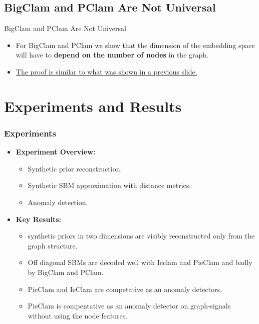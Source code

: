 \documentclass{beamer}
\begin{document}
\subsection{BigClam and PClam Are Not Universal}
\begin{frame}{BigClam and PClam Are Not Universal}

    \begin{itemize}[itemsep=1em, label=\textbullet]
        \item For BigClam and PClam we show that the dimension of the embedding space will have to \textbf{depend on the number of nodes} in the graph.
        \item \hyperlink{bipartite_blindspot}{The proof is similar to what was shown in a previous slide.}
    \end{itemize}
\end{frame}





\section{Experiments and Results}

\begin{frame}
\frametitle{Experiments}
\begin{itemize}[itemsep=1em, label=\textbullet]
    \item \textbf{Experiment Overview:}
    \begin{itemize}[itemsep=1em, label=\textbullet]
        \item Synthetic prior reconstruction.%
        \item Synthetic SBM approximation with distance metrics.%
        \item Anomaly detection.%
    \end{itemize}
    \item \textbf{Key Results:}%
    \begin{itemize}[itemsep=1em, label=\textbullet]
    \item synthetic priors in two dimensions are visibly reconstructed only from the graph structure.%
    \item Off diagonal SBMs are decoded well with Ieclam and PieClam and badly by BigClam and PClam.%
    \item PieClam and IeClam are competative as an anomaly detectors.%
    \item PieClam is compentative as an anomaly detector on graph-signals without using the node features.%
    \end{itemize}
\end{itemize}
\end{frame}
\end{document}
